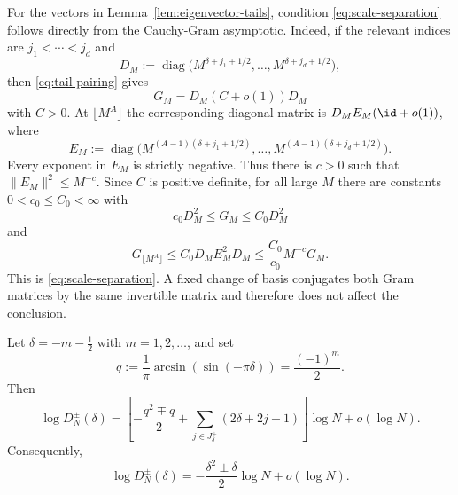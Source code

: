 For the vectors in Lemma~\ref{lem:eigenvector-tails}, condition
\eqref{eq:scale-separation} follows directly from the Cauchy-Gram asymptotic.
Indeed, if the relevant indices are $j_1<\cdots<j_d$ and
\[
 D_M:=\operatorname{diag}
 \bigl(M^{\delta+j_1+1/2},\ldots,M^{\delta+j_d+1/2}\bigr),
\]
then \eqref{eq:tail-pairing} gives
\[
 G_M=D_M(C+o(1))D_M
\]
with $C>0$.  At $\lfloor M^A\rfloor$ the corresponding diagonal matrix is
$D_ME_M(\id+o(1))$, where
\[
 E_M:=\operatorname{diag}
 \bigl(M^{(A-1)(\delta+j_1+1/2)},\ldots,
       M^{(A-1)(\delta+j_d+1/2)}\bigr).
\]
Every exponent in $E_M$ is strictly negative.  Thus there is $c>0$ such
that $\|E_M\|^2\le M^{-c}$.  Since $C$ is positive definite, for all large
$M$ there are constants $0<c_0\le C_0<\infty$ with
\[
 c_0D_M^2\le G_M\le C_0D_M^2
\]
and
\[
 G_{\lfloor M^A\rfloor}
 \le C_0D_ME_M^2D_M
 \le \frac{C_0}{c_0}M^{-c}G_M.
\]
This is \eqref{eq:scale-separation}.  A fixed change of basis conjugates both
Gram matrices by the same invertible matrix and therefore does not affect the
conclusion.

\begin{proposition}
\label{prop:threshold-asymptotics}
Let $\delta=-m-\frac12$ with $m=1,2,\ldots$, and set
\begin{equation}\label{eq:threshold-q}
 q:=\frac1\pi\arcsin(\sin(-\pi\delta))=\frac{(-1)^m}{2}.
\end{equation}
Then
\begin{equation}\label{eq:threshold-master}
 \log D_N^\pm(\delta)
 =\left[
 -\frac{q^2\mp q}{2}
 +\sum_{j\in J^\pm_\delta}(2\delta+2j+1)
 \right]\log N+o(\log N).
\end{equation}
Consequently,
\begin{equation}\label{eq:threshold-unfolded}
 \log D_N^\pm(\delta)
 =-\frac{\delta^2\pm\delta}{2}\log N+o(\log N).
\end{equation}
\end{proposition}

